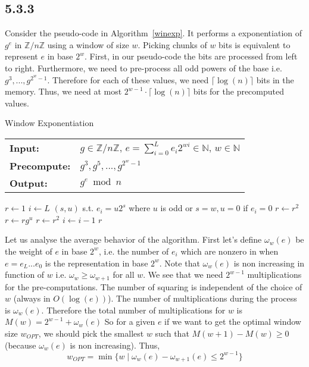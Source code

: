 \documentclass[12pt,a4paper]{article}
\newcommand {\zpz}[1]{\mathbb{Z}/#1\mathbb{Z}}
\begin{document}
    \subsection*{5.3.3}
    Consider the pseudo-code in Algorithm~\ref{winexp}. It performs a exponentiation of $g^e$ in $\zpz{n}$ using a window of size $w$.
    Picking chunks of $w$ bits is equivalent to represent $e$ in base $2^w$.
    First, in our pseudo-code the bits are processed from left to right. Furthermore, we need to pre-process all odd powers of the base i.e.
    $g^3,...,g^{2^w-1}$. Therefore for each of these values, we need $\lceil\log(n)\rceil$ bits in the memory. 
    Thus, we need at most $2^{w-1}\cdot\lceil\log(n)\rceil$ bits for the precomputed values.
    \begin{algorithm}{}
        \caption{Window Exponentiation}\label{winexp}
        \begin{tabular}{l l}
            \textbf{Input:} & $g \in \zpz{n}$, $e = \sum_{i=0}^{L} e_i 2^{wi}\in\mathbb{N}$, $w \in \mathbb{N}$\\
            \textbf{Precompute:} & $g^3,g^5,...,g^{2^w-1}$\\
            \textbf{Output:} &  $g^e \bmod n$
        \end{tabular}
        \begin{algorithmic}[1]
            \State $r \gets 1$
            \State $i \gets L$
                \State $(s,u)$ s.t. $e_i = u2^s$ where $u$ is odd or $s=w,u=0$ if $e_i = 0$
                    \State $r \gets r^2$
                \EndFor
                \State $r \gets rg^u$
                    \State $r \gets r^2$
                \EndFor
                \State $i \gets i-1$
            \EndWhile
            \State \Return $r$
        \EndFunction
        \end{algorithmic}
    \end{algorithm}
    Let us analyse the average behavior of the algorithm. First let's define $\omega_w(e)$ be the weight of $e$ in base $2^w$, i.e. the number of $e_i$ which are nonzero in 
    when $e = e_L...e_0$ is the representation in base $2^w$. Note that $\omega_w(e)$ is non increasing in function of $w$ i.e. $\omega_w \geq \omega_{w+1}$ for all $w$.
    We see that we need $2^{w-1}$ multiplications for the pre-computations. The number of squaring is independent of the choice of $w$ (always in $O(\log(e))$).
    The number of multiplications during the process is $\omega_{w}(e)$. Therefore the total number of multiplications for $w$ is $M(w) = 2^{w-1} + \omega_w(e)$
    So for a given $e$ if we want to get the optimal window size $w_{OPT}$, we should pick the smallest $w$ such that $M(w+1) - M(w) \geq 0$ (because $\omega_w(e)$ is non increasing). 
    Thus,
    \[
        w_{OPT} = \min\{w \mid \omega_{w}(e) - \omega_{w+1}(e)  \leq 2^{w-1}\}
    \]
    
\end{document}
